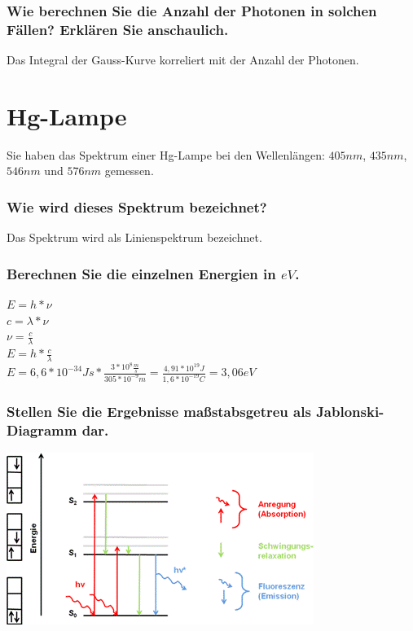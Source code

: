 \documentclass[12pt, a4paper]{article}
\begin{document}
\subsubsection{Wie berechnen Sie die Anzahl der Photonen in solchen Fällen? Erklären Sie anschaulich.}
Das Integral der Gauss-Kurve korreliert mit der Anzahl der Photonen.

\newpage

\section{Hg-Lampe}
Sie haben das Spektrum einer Hg-Lampe bei den Wellenlängen: $405nm$, $435nm$, $546nm$ und $576nm$ gemessen.

\subsubsection{Wie wird dieses Spektrum bezeichnet?}
Das Spektrum wird als Linienspektrum bezeichnet.

\subsubsection{Berechnen Sie die einzelnen Energien in $eV$.}
$E=h*\nu$\\
$c=\lambda*\nu$\\
$\nu=\frac{c}{\lambda}$\\
$E=h*\frac{c}{\lambda}$\\
$E=6,6*10^{-34}Js*\frac{3*10^8\frac{m}{s}}{305*10^{-9}m}=\frac{4,91*10^{19}J}{1,6*10^{-19}C}=3,06eV$

\subsubsection{Stellen Sie die Ergebnisse maßstabsgetreu als Jablonski-Diagramm dar.}
\includegraphics[width=\textwidth]{Jablonski.png}
\end{document}
